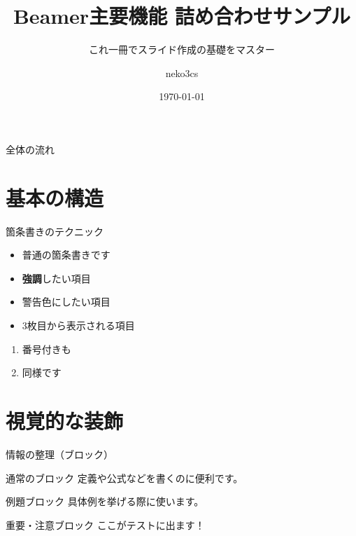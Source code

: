 \documentclass[unicode,10pt,aspectratio=169]{beamer}
\title{Beamer主要機能 詰め合わせサンプル}
\subtitle{これ一冊でスライド作成の基礎をマスター}
\author{neko3cs}
\date{\today}
\begin{document}
\begin{frame}[plain] %
    \titlepage
\end{frame}

\begin{frame}{全体の流れ}
    \tableofcontents
\end{frame}

\section{基本の構造}

\begin{frame}{箇条書きのテクニック}
    \begin{itemize}
        \item 普通の箇条書きです
        \pause %
        \item \textbf{強調}したい項目
        \item \alert{警告色}にしたい項目
        \item <3-> 3枚目から表示される項目
    \end{itemize}
    \vfill %
    \begin{enumerate}
        \item 番号付きも
        \item 同様です
    \end{enumerate}
\end{frame}

\section{視覚的な装飾}

\begin{frame}{情報の整理（ブロック）}
    \begin{block}{通常のブロック}
        定義や公式などを書くのに便利です。
    \end{block}
    
    \begin{exampleblock}{例題ブロック}
        具体例を挙げる際に使います。
    \end{exampleblock}
    
    \begin{alertblock}{重要・注意ブロック}
        ここがテストに出ます！
    \end{alertblock}
\end{frame}
\end{document}
